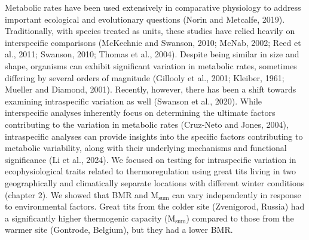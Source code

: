 \documentclass[10pt, twoside]{book} %
\begin{document}
Metabolic rates have been used extensively in comparative physiology to address important ecological and evolutionary questions (Norin and Metcalfe, 2019). Traditionally, with species treated as units, these studies have relied heavily on interspecific comparisons (McKechnie and Swanson, 2010; McNab, 2002; Reed et al., 2011; Swanson, 2010; Thomas et al., 2004). Despite being similar in size and shape, organisms can exhibit significant variation in metabolic rates, sometimes differing by several orders of magnitude (Gillooly et al., 2001; Kleiber, 1961; Mueller and Diamond, 2001). Recently, however, there has been a shift towards examining intraspecific variation as well (Swanson et al., 2020). While interspecific analyses inherently focus on determining the ultimate factors contributing to the variation in metabolic rates (Cruz-Neto and Jones, 2004), intraspecific analyses can provide insights into the specific factors contributing to metabolic variability, along with their underlying mechanisms and functional significance (Li et al., 2024). We focused on testing for intraspecific variation in ecophysiological traits related to thermoregulation using great tits living in two geographically and climatically separate locations with different winter conditions (chapter 2). We showed that BMR and M$_{\text{sum}}$ can vary independently in response to environmental factors. Great tits from the colder site (Zvenigorod, Russia) had a significantly higher thermogenic capacity (M$_{\text{sum}}$) compared to those from the warmer site (Gontrode, Belgium), but they had a lower BMR.\\
\end{document}
